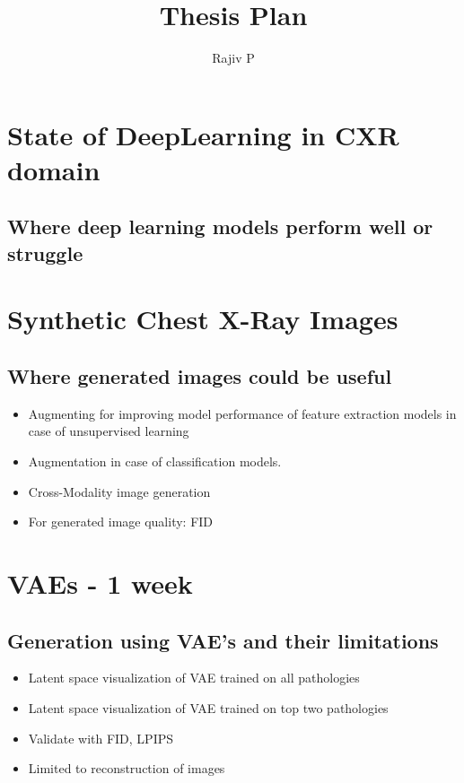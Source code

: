 \documentclass{article}
\title{Thesis Plan}
\author{Rajiv P}
\begin{document}
    \maketitle

    \tableofcontents

    \section{State of DeepLearning in CXR domain}
    \subsection{Where deep learning models perform well or struggle}

    \section{Synthetic Chest X-Ray Images}
    \subsection{Where generated images could be useful}
    \begin{itemize}
        \item Augmenting for improving model performance of feature extraction models
            in case of unsupervised learning

        \item Augmentation in case of classification models.

        \item Cross-Modality image generation

        \item For generated image quality: FID
    \end{itemize}

    \section{VAEs - 1 week}
    \subsection{Generation using VAE's and their limitations}
    \begin{itemize}
        \item Latent space visualization of VAE trained on all pathologies

        \item Latent space visualization of VAE trained on top two pathologies

        \item Validate with FID, LPIPS

        \item Limited to reconstruction of images
    \end{itemize}
\end{document}
